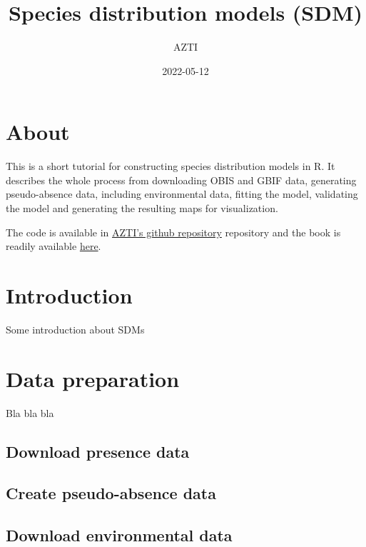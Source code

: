 \documentclass[
]{book}
\title{Species distribution models (SDM)}
\author{AZTI}
\date{2022-05-12}
\begin{document}
\maketitle

{
\setcounter{tocdepth}{1}
\tableofcontents
}
\hypertarget{about}{%
\chapter{About}\label{about}}

This is a short tutorial for constructing species distribution models in R. It describes the whole process from downloading OBIS and GBIF data, generating pseudo-absence data, including environmental data, fitting the model, validating the model and generating the resulting maps for visualization.

The code is available in \href{https://github.com/Fundacion-AZTI/SDM}{AZTI's github repository} repository and the book is readily available \href{https://fundacion-azti.github.io/SDM/}{here}.

\hypertarget{introduction}{%
\chapter{Introduction}\label{introduction}}

Some introduction about SDMs

\hypertarget{data-preparation}{%
\chapter{Data preparation}\label{data-preparation}}

Bla bla bla

\hypertarget{download-presence-data}{%
\section{Download presence data}\label{download-presence-data}}

\hypertarget{create-pseudo-absence-data}{%
\section{Create pseudo-absence data}\label{create-pseudo-absence-data}}

\hypertarget{download-environmental-data}{%
\section{Download environmental data}\label{download-environmental-data}}
\end{document}
